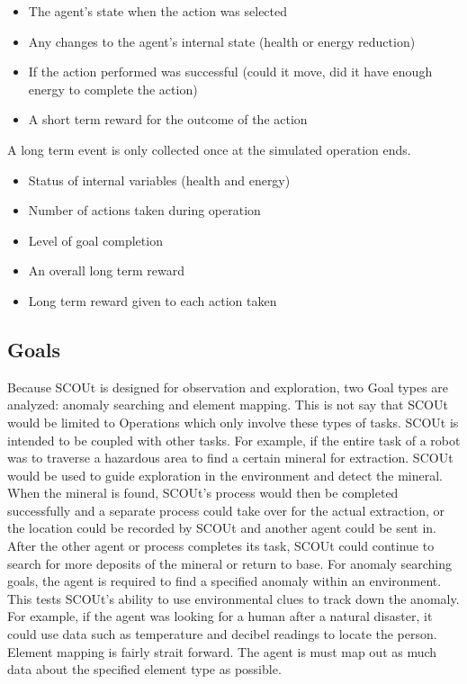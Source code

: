 \begin{itemize}
  \item The agent's state when the action was selected
  \item Any changes to the agent's internal state (health or energy reduction)
  \item If the action performed was successful (could it move, did it have enough energy to complete the action)
  \item A short term reward for the outcome of the action
\end{itemize}

A long term event is only collected once at the simulated operation ends.

\begin{itemize}
  \item Status of internal variables (health and energy)
  \item Number of actions taken during operation
  \item Level of goal completion
  \item An overall long term reward
  \item Long term reward given to each action taken
\end{itemize}


\subsection{Goals}
Because SCOUt is designed for observation and exploration, two Goal types are analyzed: anomaly searching and element mapping.
This is not say that SCOUt would be limited to Operations which only involve these types of tasks.
SCOUt is intended to be coupled with other tasks.
For example, if the entire task of a robot was to traverse a hazardous area to find a certain mineral for extraction.
SCOUt would be used to guide exploration in the environment and detect the mineral.
When the mineral is found, SCOUt's process would then be completed successfully and a separate process could take over for the actual extraction, or the location could be recorded by SCOUt and another agent could be sent in.
After the other agent or process completes its task, SCOUt could continue to search for more deposits of the mineral or return to base.
For anomaly searching goals, the agent is required to find a specified anomaly within an environment.
This tests SCOUt's ability to use environmental clues to track down the anomaly.
For example, if the agent was looking for a human after a natural disaster, it could use data such as temperature and decibel readings to locate the person.
Element mapping is fairly strait forward.
The agent is must map out as much data about the specified element type as possible.


